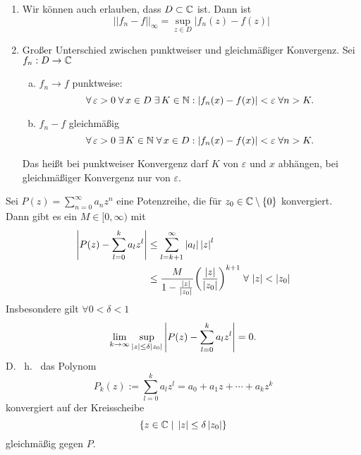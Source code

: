 \documentclass[../ana1.tex]{subfiles}
\begin{document}
\begin{bem} \leavevmode
    \begin{enumerate}
        \item Wir können auch erlauben, dass \(D \subset \mathbb{C} \) 
        ist. Dann ist 
        \[ ||f_n-f||_\infty = \underset{z \in D}{\sup}|f_n(z) 
        - f(z)| \]
        \item Großer Unterschied zwischen punktweiser und 
        gleichmäßiger Konvergenz. Sei \( f_n : D \rightarrow \mathbb{C} \) 
        \begin{enumerate}[(a)]
            \item \( f_n \rightarrow f \) punktweise: 
            \[ \forall \, \varepsilon > 0 \; \forall \, x \in 
            D \; \exists \, K \in \mathbb{N}: \left| f_n(x) - f(x) \right| 
            < \varepsilon \; \forall n > K. \]
            \item \( f_n - f \) gleichmäßig
            \[ \forall \, \varepsilon > 0 \; \exists \, K \in \mathbb{N} 
            \;\forall \, x \in D: \left| f_n(x) - f(x) \right| < \varepsilon 
            \;\forall n > K. \]
        \end{enumerate}
        Das heißt bei punktweiser Konvergenz darf \( K \) von 
        \( \varepsilon \) und \( x \) abhängen, bei gleichmäßiger 
        Konvergenz nur von \( \varepsilon \).
    \end{enumerate}
\end{bem}
\begin{lem}\label{satz:glmKonvPotenz}
    Sei \( P(z) = \sum_{n=0}^\infty a_n z^n \) eine Potenzreihe, 
    die für \( z_0 \in \mathbb{C} \setminus \{0\} \) konvergiert. \\
    Dann gibt es ein \( M \in [0,\infty) \) mit 
    \begin{align*}
        \left| P(z) - \sum_{l=0}^k a_l z^l \right| 
        &\leq \sum_{l=k+1}^\infty \left| a_l \right| \left| z \right|^l \\
        &\leq \frac{ M }{ 1 - \frac{\left|z\right|}{\left|z_0\right|} } 
        {\left( \frac{\left|z\right|}{\left|z_0\right|} \right)}^{k+1} 
        \; \forall \, \left|z\right| < \left|z_0\right|
    \end{align*}
    Insbesondere gilt \( \forall 0 < \delta < 1 \)
    \[ \lim\limits_{k\rightarrow\infty} \underset{\left|z\right| \leq \delta \left|z_0\right|}{\sup} 
    \left| P(z) - \sum_{l=0}^k a_l z^l \right| = 0. \]
    D. \ h. \ das Polynom 
    \[ P_k(z) := \sum_{l=0}^k a_l z^l 
    = a_0 + a_1 z + \cdots + a_k z^k \]
    konvergiert auf der Kreisscheibe 
    \[ \{ z \in \mathbb{C} \;\vert \; \left|z\right| \leq 
    \delta \left|z_0\right| \} \]
    gleichmäßig gegen \( P \).
\end{lem}
\end{document}
